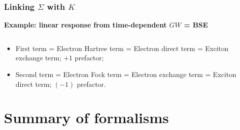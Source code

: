 \documentclass[t]{beamer}
\begin{document}
\begin{frame}
    \frametitle{Linking $\Sigma$ with $K$}

    \textbf{Example: linear response from time-dependent $GW$ = BSE}
    
    \begin{equation}
        
    \end{equation}

    \begin{itemize}
        \item First term = Electron Hartree term = Electron direct term = Exciton exchange term;
            $+1$ prefactor;
        \item Second term = Electron Fock term = Electron exchange term = Exciton direct term;
            $(-1)$ prefactor.
    \end{itemize}
\end{frame}

\section{Summary of formalisms} 
\end{document}
